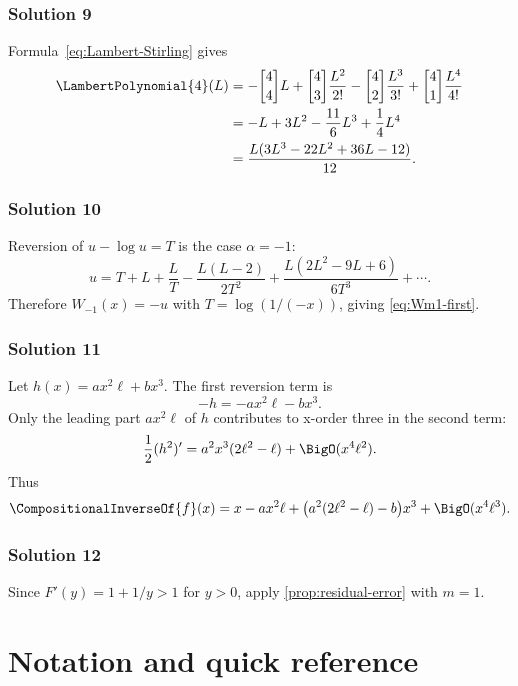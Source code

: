 \documentclass[11pt,openany]{book}
\theoremstyle{definition}
\theoremstyle{plain}
\theoremstyle{remark}
\newcommand{\rev}[1]{\CompositionalInverseOf{#1}}
\newcommand{\stirlingone}[2]{\genfrac{[}{]}{0pt}{}{#1}{#2}}
\begin{document}
\subsection*{Solution 9}
Formula~\eqref{eq:Lambert-Stirling} gives
\begin{align*}
 \LambertPolynomial{4}(L)
 &=-\stirlingone{4}{4}L
 +\stirlingone{4}{3}\frac{L^2}{2!}
 -\stirlingone{4}{2}\frac{L^3}{3!}
 +\stirlingone{4}{1}\frac{L^4}{4!}\\
 &=-L+3L^2-\frac{11}{6}L^3+\frac14L^4\\
 &=\frac{L(3L^3-22L^2+36L-12)}{12}.
\end{align*}

\subsection*{Solution 10}
Reversion of \(u-\log u=T\) is the case \(\alpha=-1\):
\[
 u=T+L+\frac{L}{T}-\frac{L(L-2)}{2T^2}
 +\frac{L(2L^2-9L+6)}{6T^3}+\cdots.
\]
Therefore \(W_{-1}(x)=-u\) with
\(T=\log(1/(-x))\), giving \cref{eq:Wm1-first}.

\subsection*{Solution 11}
Let \(h(x)=a x^2\ell+b x^3\).  The first reversion term is
\[
 -h=-a x^2\ell-bx^3.
\]
Only the leading part \(a x^2\ell\) of \(h\) contributes to x-order three in
the second term:
\[
 \frac12(h^2)'=a^2x^3(2\ell^2-\ell)+\BigO(x^4\ell^2).
\]
Thus
\[
 \rev f(x)=x-a x^2\ell+
 \bigl(a^2(2\ell^2-\ell)-b\bigr)x^3
 +\BigO(x^4\ell^3).
\]

\subsection*{Solution 12}
Since \(F'(y)=1+1/y>1\) for \(y>0\), apply
\cref{prop:residual-error} with \(m=1\).

\chapter{Notation and quick reference}\label{app:notation}
\end{document}
